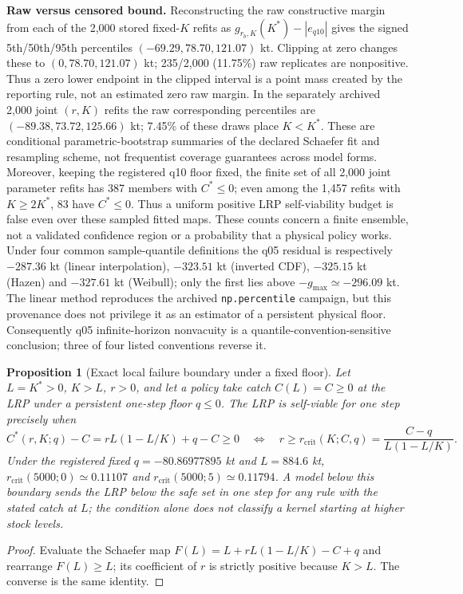 \documentclass[11pt]{article}
\newtheorem{proposition}[theorem]{Proposition}
\begin{document}
\noindent\textbf{Raw versus censored bound.} Reconstructing the raw
constructive margin from each of the 2,000 stored fixed-$K$ refits as
$g_{r_b,K}(K^*)-|e_{q10}|$ gives the signed 5th/50th/95th
percentiles $(-69.29,78.70,121.07)$ kt. Clipping at zero changes these
to $(0,78.70,121.07)$ kt; 235/2,000 (11.75\%) raw replicates are
nonpositive. Thus a zero lower endpoint in the clipped interval is a
point mass created by the reporting rule, not an estimated zero raw
margin. In the separately archived 2,000 joint $(r,K)$ refits the raw
corresponding percentiles are $(-89.38,73.72,125.66)$ kt; 7.45\% of
these draws place $K<K^*$. These are conditional parametric-bootstrap
summaries of the declared Schaefer fit and resampling scheme, not
frequentist coverage guarantees across model forms. Moreover, keeping the
registered q10 floor fixed, the finite set of all 2,000 joint parameter
refits has 387 members with $C^*\le0$; even among the 1,457 refits
with $K\ge2K^*$, 83 have $C^*\le0$. Thus a uniform positive LRP
self-viability budget is false even over these sampled fitted maps.
These counts concern a finite ensemble, not a validated confidence
region or a probability that a physical policy works. Under four common
sample-quantile definitions the q05 residual is respectively
$-287.36$ kt (linear interpolation), $-323.51$ kt (inverted CDF),
$-325.15$ kt (Hazen) and $-327.61$ kt (Weibull); only the first lies
above $-g_{\max}\simeq-296.09$ kt. The linear method reproduces the
archived \texttt{np.percentile} campaign, but this provenance does not
privilege it as an estimator of a persistent physical floor. Consequently
q05 infinite-horizon nonvacuity is a quantile-convention-sensitive
conclusion; three of four listed conventions reverse it.

\begin{proposition}[Exact local failure boundary under a fixed floor]
\label{prop:budget-failure-boundary}
Let $L=K^*>0$, $K>L$, $r>0$, and let a policy take catch $C(L)=C\ge0$
at the LRP under a persistent one-step floor $q\le0$. The LRP is
self-viable for one step precisely when
\[
C^*(r,K;q)-C=rL(1-L/K)+q-C\ge0
\quad\Longleftrightarrow\quad
r\ge r_{\mathrm{crit}}(K;C,q)
=\frac{C-q}{L(1-L/K)}.
\]
Under the registered fixed $q=-80.86977895$ kt and $L=884.6$ kt,
$r_{\mathrm{crit}}(5000;0)\simeq0.11107$ and
$r_{\mathrm{crit}}(5000;5)\simeq0.11794$.
A model below this boundary sends the LRP below the safe set in one step
for any rule with the stated catch at $L$; the condition alone does not
classify a kernel starting at higher stock levels.
\end{proposition}
\begin{proof}
Evaluate the Schaefer map $F(L)=L+rL(1-L/K)-C+q$ and rearrange
$F(L)\ge L$; its coefficient of $r$ is strictly positive because
$K>L$. The converse is the same identity.
\end{proof}
\end{document}
